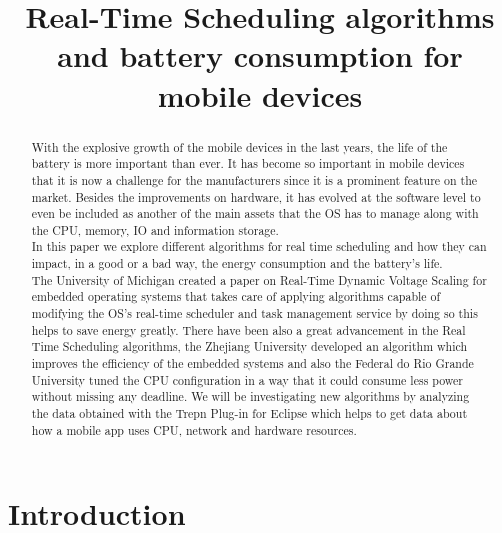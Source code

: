 \documentclass[conference]{IEEEtran}
\begin{document}
 

\title{Real-Time Scheduling algorithms and battery consumption for mobile devices}



\author{

}


\maketitle


\begin{abstract}
With the explosive growth of the mobile devices in the last years, the life of the battery is more important than ever. It has become so important in mobile devices that it is now a challenge for the manufacturers since it is a prominent feature on the market. Besides the improvements on hardware, it has evolved at the software level to even be included as another of the main assets that the OS has to manage along with the CPU, memory, IO and information storage.\\
In this paper we explore different algorithms for real time scheduling and how they can impact, in a good or a bad way, the energy consumption and the battery’s life.\\
The University of Michigan created a paper on Real-Time Dynamic Voltage Scaling for embedded operating systems that takes care of applying algorithms capable of modifying the OS's real-time scheduler and task management service by doing so this helps to save energy greatly. There have been also a great advancement in the Real Time Scheduling algorithms, the Zhejiang University developed an algorithm which improves the efficiency of the embedded systems and also the Federal do Rio Grande University tuned the CPU configuration in a way that it could consume less power without missing any deadline. We will be investigating new algorithms by analyzing the data obtained with the Trepn Plug-in for Eclipse which helps to get data about how a mobile app uses CPU, network and hardware resources.
\end{abstract}

\section{Introduction}
\end{document}
